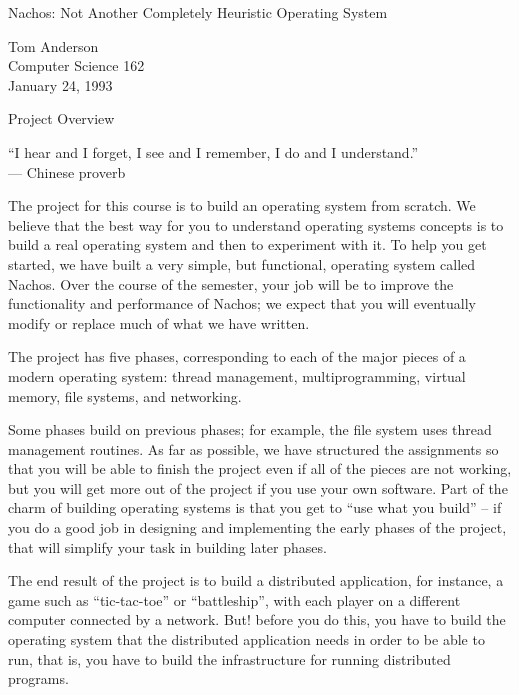 


\begin{center}
{\large Nachos: Not Another Completely Heuristic Operating System

\vspace{.2in}
Tom Anderson\\
Computer Science 162\\
January 24, 1993

\vspace{.2in}
Project Overview
}

\vspace{.2in}

``I hear and I forget, I see and I remember, I do and I understand.''\\
--- Chinese proverb
\end{center}

The project for this course is to build an operating system from scratch.
We believe that the best way for you to understand operating systems
concepts is to build a real operating system and then to experiment with it.
To help you get started, we have built a very simple, but functional,
operating system called Nachos.
Over the course of the semester, your job will be to improve the
functionality and performance of Nachos; we expect that you will
eventually modify or replace much of what we have written.

The project has five phases, corresponding to each of the major pieces
of a modern operating system: thread management,
multiprogramming, virtual memory, file systems, and networking.

Some phases build on previous phases; for example, the file system
uses thread management routines.
As far as possible, we have structured the assignments so that you
will be able to finish the project even if all of the pieces are not working,
but you will get more out of the project if you use your own software.
Part of the charm of building operating systems is that you get to
``use what you build'' -- if you do a good job in designing and
implementing the early phases of the project, that will simplify your
task in building later phases.

The end result of the project is to build a distributed application,
for instance, a game such as
``tic-tac-toe'' or ``battleship'', with each player on a different
computer connected by a network.  But! before you do this, you
have to build the operating system that the distributed application needs
in order to be able to run, that is, you have to build the infrastructure
for running distributed programs.

